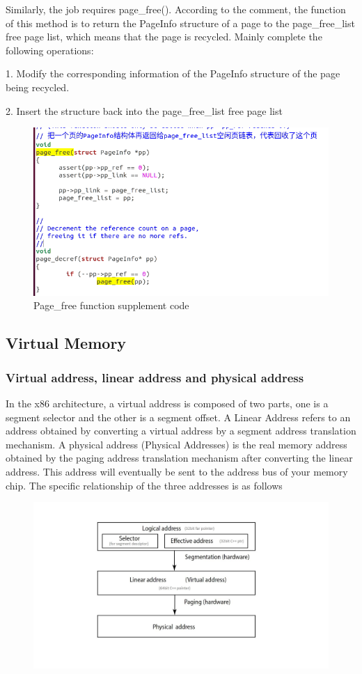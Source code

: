 Similarly, the job requires page\_free(). According to the comment, the function of this method is to return the PageInfo structure of a page to the page\_free\_list free page list, which means that the page is recycled. Mainly complete the following operations:

1. Modify the corresponding information of the PageInfo structure of the page being recycled.

2. Insert the structure back into the page\_free\_list free page list
\begin{figure}[H]
\centering
\includegraphics[width=0.8\linewidth]{figure/page_free_changed}
\caption{Page\_free function supplement code}
\end{figure}
\subsection{Virtual Memory}
\subsubsection{Virtual address, linear address and physical address}

In the x86 architecture, a virtual address is composed of two parts, one is a segment selector and the other is a segment offset. A Linear Address refers to an address obtained by converting a virtual address by a segment address translation mechanism. A physical address (Physical Addresses) is the real memory address obtained by the paging address translation mechanism after converting the linear address. This address will eventually be sent to the address bus of your memory chip. The specific relationship of the three addresses is as follows
\begin{figure}[H]
\centering
\includegraphics[width=0.8\linewidth]{figure/virtual_linear_physical_address}
\end{figure}


